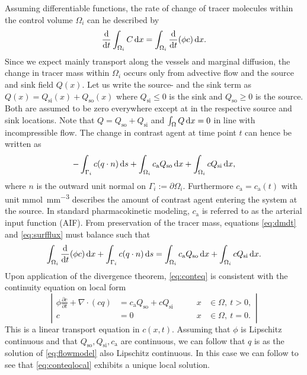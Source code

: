 \documentclass[paper=a4, fontsize=12pt,parskip=half,headings=small]{scrartcl}
\newcommand{\Qso}{Q_{\mathrm{so}}}
\newcommand{\Qsi}{Q_{\mathrm{si}}}
\newcommand{\ca}{c_\mathrm{a}}
\newcommand{\sic}{\milli\mol\per\cubic\milli\meter}
\begin{document}
	Assuming differentiable functions, the rate of change of tracer molecules within the control volume $\Omega_i$ can he described by
	\begin{equation}
		\frac{\mathrm{d}}{\mathrm{d} t}\int_{\Omega_i}C \,\mathrm{d} x = \int_{\Omega_i}\frac{\mathrm{d}}{\mathrm{d} t}(\phi c) \,\mathrm{d} x.
		\label{eq:dmdt}
	\end{equation}	
	Since we expect mainly transport along the vessels and marginal diffusion, the change in tracer mass within $\Omega_i$ occurs only from advective flow and the source and sink field $Q(x)$.
	Let us write the source- and the sink term as $Q(x) = \Qsi(x) + \Qso(x)$ where $\Qsi \le 0$ is the sink and $\Qso \ge 0$ is the source. 
	Both are assumed to be zero everywhere except at in the respective source and sink locations.
	Note that $Q = \Qso + \Qsi$ and $\int_\Omega Q \,\mathrm{d} x =0$ in line with incompressible flow. 
	The change in contrast agent at time point $t$ can hence be written as
	\begin{equation}
		-\int_{ \Gamma_i}c(q \cdot n)\diffint s + \int_{\Omega_i}\ca \Qso \diffint x + \int_{\Omega_i}c\Qsi \diffint x,
		\label{eq:surfflux}
	\end{equation}
	where $n$ is the outward unit normal on $\Gamma_i := \partial \Omega_i$.
	Furthermore $\ca = \ca(t)$ with unit \si{\sic} describes the amount of contrast agent entering the system at the source. 
	In standard pharmacokinetic modeling, $\ca$ is referred to as the arterial input function (AIF).
	From preservation of the tracer mass, equations \eqref{eq:dmdt} and \eqref{eq:surfflux} must balance such that
	\begin{equation}
		\int_{\Omega_i}\diffop{t} (\phi c) \diffint x + \int_{ \Gamma_i}c(q \cdot n) \diffint s = \int_{\Omega_i}\ca\Qso \diffint x + \int_{\Omega_i}c \Qsi \diffint x.
		\label{eq:conteq}
	\end{equation}
	Upon application of the divergence theorem, \eqref{eq:conteq} is consistent with the continuity equation on local form
	\begin{equation}
		\left\vert
		\begin{alignedat}{2}
			\phi \frac{\partial c}{\partial t} + \nabla \cdot (cq) &= \ca\Qso + c\Qsi \qquad	&x &\in \Omega, \ t>0,  \\
			c &= 0 																			 	&x &\in \Omega, \ t=0.
		\end{alignedat}
		\right\vert
		\label{eq:conteqlocal}
	\end{equation}
	This is a linear transport equation in $c(x,t)$. 
	Assuming that $\phi$ is Lipschitz continuous and that $\Qso,\Qsi,\ca$ are continuous, we can follow that $q$ is as the solution of \eqref{eq:flowmodel} also Lipschitz continuous.
	In this case we can follow \cite{evans98} to see that \eqref{eq:conteqlocal} exhibits a unique local solution.
	
\end{document}
